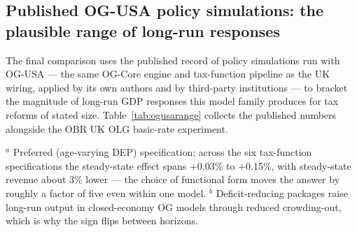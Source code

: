 \subsection{Published OG-USA policy simulations: the plausible range of long-run responses}
\label{subsec:ogusarange}

The final comparison uses the published record of policy simulations run with OG-USA --- the same OG-Core engine and tax-function pipeline as the UK wiring, applied by its own authors and by third-party institutions --- to bracket the magnitude of long-run GDP responses this model family produces for tax reforms of stated size. Table~\ref{tab:ogusarange} collects the published numbers alongside the OBR UK OLG basic-rate experiment.

\begin{table}[t]
\centering
\caption{Published long-run GDP effects from OG-Core-family and comparable OLG simulations}
\label{tab:ogusarange}
\begin{minipage}{\textwidth}
\vspace{2pt}\footnotesize $^{a}$ Preferred (age-varying DEP) specification; across the six tax-function specifications the steady-state effect spans $+$0.03\% to $+$0.15\%, with steady-state revenue about 3\% lower --- the choice of functional form moves the answer by roughly a factor of five even within one model. $^{b}$ Deficit-reducing packages raise long-run output in closed-economy OG models through reduced crowding-out, which is why the sign flips between horizons.
\end{minipage}
\end{table}


